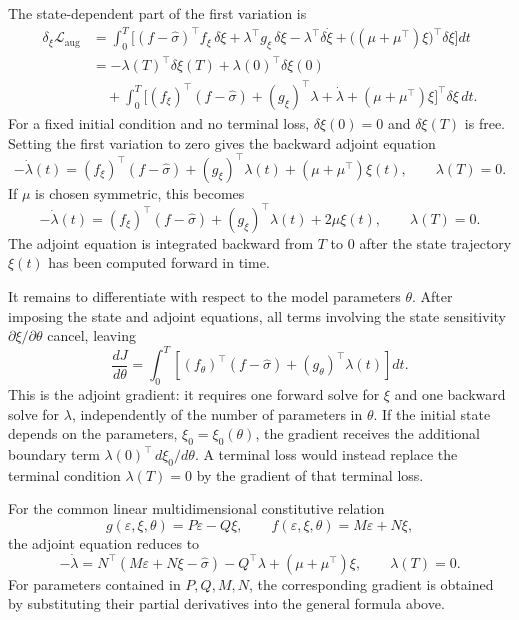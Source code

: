 \documentclass[11pt]{article}
\begin{document}
The state-dependent part of the first variation is
\begin{align}
    \delta_\xi\mathcal{L}_{\mathrm{aug}}
     & =\int_0^T\Big[
        (f-\widehat{\sigma})^\top f_\xi\,\delta\xi
        +\lambda^\top g_\xi\,\delta\xi
        -\lambda^\top\delta\dot{\xi}
        +\big((\mu+\mu^\top)\xi\big)^\top\delta\xi
    \Big]dt                           \\
     & = -\lambda(T)^\top\delta\xi(T)
    +\lambda(0)^\top\delta\xi(0)      \\
     & \quad+\int_0^T\Big[
        (f_\xi)^\top(f-\widehat{\sigma})
        +(g_\xi)^\top\lambda
        +\dot{\lambda}
        +(\mu+\mu^\top)\xi
        \Big]^\top\delta\xi\,dt.
\end{align}
For a fixed initial condition and no terminal loss, $\delta\xi(0)=0$ and
$\delta\xi(T)$ is free. Setting the first variation to zero gives the
backward adjoint equation
\begin{equation}
    -\dot{\lambda}(t)
    =(f_\xi)^\top(f-\widehat{\sigma})
    +(g_\xi)^\top\lambda(t)
    +(\mu+\mu^\top)\xi(t),
    \qquad \lambda(T)=0.
\end{equation}
If $\mu$ is chosen symmetric, this becomes
\begin{equation}
    -\dot{\lambda}(t)
    =(f_\xi)^\top(f-\widehat{\sigma})
    +(g_\xi)^\top\lambda(t)+2\mu\xi(t),
    \qquad \lambda(T)=0.
\end{equation}
The adjoint equation is integrated backward from $T$ to $0$ after the state
trajectory $\xi(t)$ has been computed forward in time.

It remains to differentiate with respect to the model parameters $\theta$.
After imposing the state and adjoint equations, all terms involving the
state sensitivity $\partial\xi/\partial\theta$ cancel, leaving
\begin{equation}
    \frac{dJ}{d\theta}
    =\int_0^T\left[
        (f_\theta)^\top(f-\widehat{\sigma})
        +(g_\theta)^\top\lambda(t)
        \right]dt.
\end{equation}
This is the adjoint gradient: it requires one forward solve for $\xi$ and one
backward solve for $\lambda$, independently of the number of parameters in
$\theta$. If the initial state depends on the parameters, $\xi_0=\xi_0(\theta)$,
the gradient receives the additional boundary term
$\lambda(0)^\top\,d\xi_0/d\theta$. A terminal loss would instead replace the
terminal condition $\lambda(T)=0$ by the gradient of that terminal loss.

For the common linear multidimensional constitutive relation
\begin{equation}
    g(\varepsilon,\xi,\theta)=P\varepsilon-Q\xi,
    \qquad f(\varepsilon,\xi,\theta)=M\varepsilon+N\xi,
\end{equation}
the adjoint equation reduces to
\begin{equation}
    -\dot{\lambda}
    =N^\top(M\varepsilon+N\xi-\widehat{\sigma})
    -Q^\top\lambda
    +(\mu+\mu^\top)\xi,
    \qquad \lambda(T)=0.
\end{equation}
For parameters contained in $P,Q,M,N$, the corresponding gradient is obtained
by substituting their partial derivatives into the general formula above.
\end{document}
